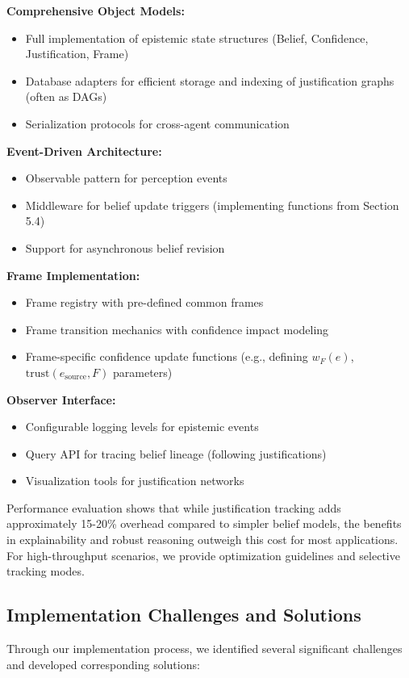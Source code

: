 \documentclass[10pt,a4paper]{article}
\begin{document}
\textbf{Comprehensive Object Models:}
\begin{itemize}
\item Full implementation of epistemic state structures (Belief, Confidence, Justification, Frame)
\item Database adapters for efficient storage and indexing of justification graphs (often as DAGs)
\item Serialization protocols for cross-agent communication
\end{itemize}

\textbf{Event-Driven Architecture:}
\begin{itemize}
\item Observable pattern for perception events
\item Middleware for belief update triggers (implementing functions from Section 5.4)
\item Support for asynchronous belief revision
\end{itemize}

\textbf{Frame Implementation:}
\begin{itemize}
\item Frame registry with pre-defined common frames
\item Frame transition mechanics with confidence impact modeling
\item Frame-specific confidence update functions (e.g., defining $w_F(e)$, $\mathrm{trust}(e_{\mathrm{source}}, F)$ parameters)
\end{itemize}

\textbf{Observer Interface:}
\begin{itemize}
\item Configurable logging levels for epistemic events
\item Query API for tracing belief lineage (following justifications)
\item Visualization tools for justification networks
\end{itemize}

Performance evaluation shows that while justification tracking adds approximately 15-20\% overhead compared to simpler belief models, the benefits in explainability and robust reasoning outweigh this cost for most applications. For high-throughput scenarios, we provide optimization guidelines and selective tracking modes.

\subsection{Implementation Challenges and Solutions}
Through our implementation process, we identified several significant challenges and developed corresponding solutions:
\end{document}
